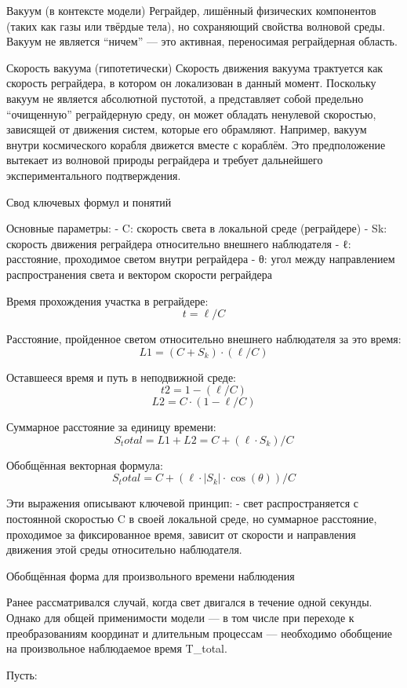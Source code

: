 \documentclass[12pt]{article}
\begin{document}
Вакуум (в контексте модели)
Реграйдер, лишённый физических компонентов (таких как газы или твёрдые тела), но сохраняющий свойства волновой среды. Вакуум не является “ничем” — это активная, переносимая реграйдерная область.

Скорость вакуума (гипотетически)
Скорость движения вакуума трактуется как скорость реграйдера, в котором он локализован в данный момент. Поскольку вакуум не является абсолютной пустотой, а представляет собой предельно “очищенную” реграйдерную среду, он может обладать ненулевой скоростью, зависящей от движения систем, которые его обрамляют. Например, вакуум внутри космического корабля движется вместе с кораблём. Это предположение вытекает из волновой природы реграйдера и требует дальнейшего экспериментального подтверждения.


Свод ключевых формул и понятий

Основные параметры:
- C: скорость света в локальной среде (реграйдере)
- Sk: скорость движения реграйдера относительно внешнего наблюдателя
- ℓ: расстояние, проходимое светом внутри реграйдера
- θ: угол между направлением распространения света и вектором скорости реграйдера

Время прохождения участка в реграйдере:
\[
t = \ell / C
\]

Расстояние, пройденное светом относительно внешнего наблюдателя за это время:
\[
L1 = (C + S_k) \cdot (\ell / C)
\]

Оставшееся время и путь в неподвижной среде:
\[
t2 = 1 - (\ell / C)
\]
\[
L2 = C \cdot (1 - \ell / C)
\]

Суммарное расстояние за единицу времени:
\[
S_total = L1 + L2 = C + (\ell \cdot S_k) / C
\]

Обобщённая векторная формула:
\[
S_total = C + (\ell \cdot \left|S_k\right| \cdot \cos(\theta)) / C
\]

Эти выражения описывают ключевой принцип:
- свет распространяется с постоянной скоростью C в своей локальной среде, но суммарное расстояние, проходимое за фиксированное время, зависит от скорости и направления движения этой среды относительно наблюдателя.


Обобщённая форма для произвольного времени наблюдения

Ранее рассматривался случай, когда свет двигался в течение одной секунды. Однако для общей применимости модели — в том числе при переходе к преобразованиям координат и длительным процессам — необходимо обобщение на произвольное наблюдаемое время T_total.

Пусть:
\end{document}
